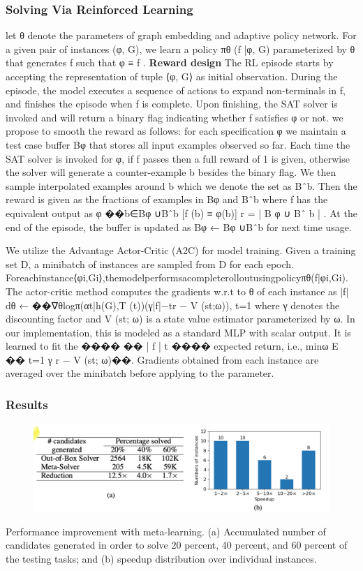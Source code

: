 \documentclass{article}
\begin{document}
\subsubsection{Solving Via Reinforced Learning}
let θ denote the parameters of graph embedding and adaptive policy network. For a given pair of instances (φ, G), we learn a policy πθ (f |φ, G) parameterized by θ that generates f such that φ ≡ f .
\textbf{Reward design} The RL episode starts by accepting the representation of tuple ⟨φ, G⟩ as initial observation. During the episode, the model executes a sequence of actions to expand non-terminals in f, and finishes the episode when f is complete. Upon finishing, the SAT solver is invoked and will return a binary flag indicating whether f satisfies φ or not. we propose to smooth the reward as follows: for each specification φ we maintain a test case buffer Bφ that stores all input examples observed so far. Each time the SAT solver is invoked for φ, if f passes then a full reward of 1 is given, otherwise the solver will generate a counter-example b besides the binary flag. We then sample interpolated examples around b which we denote the set as Bˆb. Then the reward is given as the fractions of examples in Bφ and Bˆb where f has the equivalent output as φ
��b∈Bφ ∪Bˆb [f (b) ≡ φ(b)] r = | B φ ∪ Bˆ b | .
At the end of the episode, the buffer is updated as Bφ ← Bφ ∪Bˆb for next time usage. 

We utilize the Advantage Actor-Critic (A2C) for model training. Given a training set D, a minibatch of instances are sampled from D for each epoch. Foreachinstance⟨φi,Gi⟩,themodelperformsacompleterolloutusingpolicyπθ(f|φi,Gi). The actor-critic method computes the gradients w.r.t to θ of each instance as
|f|
dθ ← ��∇θlogπ(αt|h(G),T (t))(γ|f|−tr − V (st;ω)),
t=1
where γ denotes the discounting factor and V (st; ω) is a state value estimator parameterized by ω.
In our implementation, this is modeled as a standard MLP with scalar output. It is learned to fit the
���� �� | f | t ����
expected return, i.e., minω E �� t=1 γ r − V (st; ω)��. Gradients obtained from each instance are
averaged over the minibatch before applying to the parameter.
\subsubsection{Results}
\begin{figure}[ht]
\vskip 0.2in
\begin{center}
\centerline{\includegraphics[width=\columnwidth]{Images/Synthesis1-3.png}}
\label{icml-historical}
\end{center}
\vskip -0.2in
\end{figure}
Performance improvement with meta-learning. (a) Accumulated number of candidates generated in order to solve 20 percent, 40 percent, and 60 percent of the testing tasks; and (b) speedup distribution over individual instances.
\end{document}
